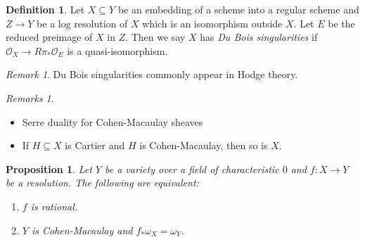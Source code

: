\documentclass[leqno, openany]{memoir}
\newtheorem{prop}[thm]{Proposition}
\theoremstyle{definition}
\newtheorem{defn}[thm]{Definition}
\theoremstyle{remark}
\newtheorem{rmk}[thm]{Remark}
\newtheorem{rmks}[thm]{Remarks}
\theoremstyle{plain}
\theoremstyle{definition}
\theoremstyle{remark}
\newcommand{\mc}[1]{\mathcal{#1}}
\begin{document}
\begin{defn}
    Let $X \subseteq Y$ be an embedding of a scheme into a regular scheme and $Z \to Y$ be a log resolution of $X$ which is an isomorphism outside $X$. Let $E$ be the reduced preimage of $X$ in $Z$. Then we say $X$ has \textit{Du Bois singularities} if $\mc{O}_X \to R\pi_* \mc{O}_E$ is a quasi-isomorphism.
\end{defn}

\begin{rmk}
    Du Bois singularities commonly appear in Hodge theory.
\end{rmk}

\begin{rmks}\leavevmode
    \begin{itemize}
        \item Serre duality for Cohen-Macaulay sheaves
        \item If $H \subseteq X$ is Cartier and $H$ is Cohen-Macaulay, then so is $X$.
    \end{itemize}
\end{rmks}

\begin{prop}
    Let $Y$ be a variety over a field of characteristic $0$ and $f \colon X \to Y$ be a resolution. The following are equivalent:
    \begin{enumerate}
        \item $f$ is rational.
        \item $Y$ is Cohen-Macaulay and $f_* \omega_X = \omega_Y$.
    \end{enumerate}
\end{prop}
\end{document}
